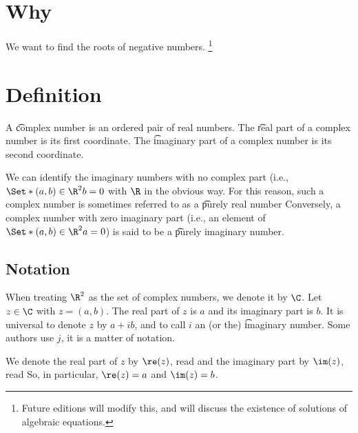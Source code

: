 
\section*{Why}

We want to find the roots of negative numbers.
  \ifhmode\unskip\fi\footnote{
Future editions will modify this, and will discuss the existence of solutions of algebraic equations.
  }

\section*{Definition}

A \t{complex number} is an ordered pair of real numbers.
The \t{real part} of a complex number is its first coordinate.
The \t{imaginary part} of a complex number is its second coordinate.

We can identify the imaginary numbers with no complex part (i.e., $\Set*{(a, b) \in \R ^2}{b = 0}$ with $\R $ in the obvious way.
For this reason, such a complex number is sometimes referred to as a \t{purely real number}
Conversely, a complex number with zero imaginary part (i.e., an element of $\Set*{(a, b) \in \R ^2}{a = 0}$) is said to be a \t{purely imaginary number}.

\subsection*{Notation}

When treating $\R ^2$ as the set of complex numbers, we denote it by $\C $.
Let $z \in \C $ with $z = (a, b)$.
The real part of $z$ is $a$ and its imaginary part is $b$.
It is universal to denote $z$ by $a + ib$, and to call $i$ an (or the) \t{imaginary number}.
Some authors use $j$, it is a matter of notation.

We denote the real part of $z$ by $\re(z)$, read  and the imaginary part by $\im(z)$, read 
So, in particular, $\re(z) = a$ and $\im(z) = b$.

\blankpage